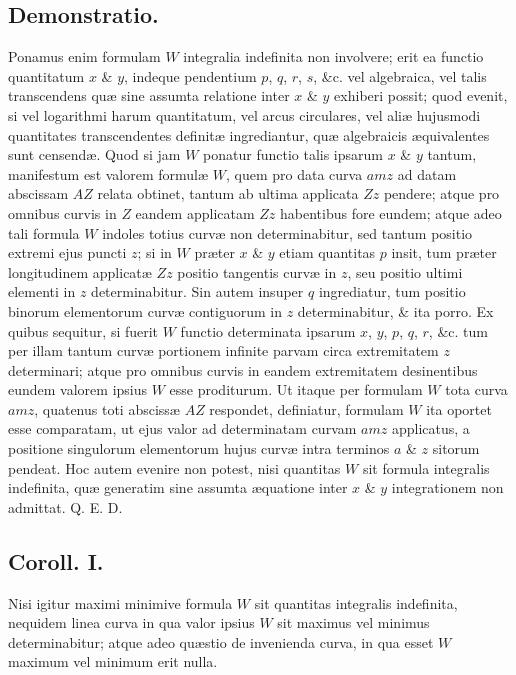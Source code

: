 \subsection*{Demonstratio.}
Ponamus enim formulam $W$ integralia indefinita non involvere; erit ea functio quantitatum $x$ \& $y$, indeque pendentium $p$, $q$, $r$, $s$, \&c. vel algebraica, vel talis transcendens quæ sine assumta relatione inter $x$ \& $y$ exhiberi possit; quod evenit, si vel logarithmi harum quantitatum, vel arcus circulares, vel aliæ hujusmodi quantitates transcendentes definitæ ingrediantur, quæ algebraicis æquivalentes sunt censendæ. Quod si jam $W$ ponatur functio talis ipsarum $x$ \& $y$ tantum, manifestum est valorem formulæ $W$, quem pro data curva $amz$ ad datam abscissam $AZ$ relata obtinet, tantum ab ultima applicata $Zz$ pendere; atque pro omnibus curvis in $Z$ eandem applicatam $Zz$ habentibus fore eundem; atque adeo tali formula $W$ indoles totius curvæ non determinabitur, sed tantum positio extremi ejus puncti $z$; si in $W$ præter $x$ \& $y$ etiam quantitas $p$ insit, tum præter longitudinem applicatæ $Zz$ positio tangentis curvæ in $z$, seu positio ultimi elementi in $z$ determinabitur. Sin autem insuper $q$ ingrediatur, tum positio binorum elementorum curvæ contiguorum in $z$ determinabitur, \& ita porro. Ex quibus sequitur, si fuerit $W$ functio determinata ipsarum $x$, $y$, $p$, $q$, $r$, \&c. tum per illam tantum curvæ portionem infinite parvam circa extremitatem $z$ determinari; atque pro omnibus curvis in eandem extremitatem desinentibus eundem valorem ipsius $W$ esse proditurum. Ut itaque per formulam $W$ tota curva $amz$, quatenus toti abscissæ $AZ$ respondet, definiatur, formulam $W$ ita oportet esse comparatam, ut ejus valor ad determinatam curvam $amz$ applicatus, a positione singulorum elementorum hujus curvæ intra terminos $a$ \& $z$ sitorum pendeat. Hoc autem evenire non potest, nisi quantitas $W$ sit formula integralis indefinita, quæ generatim sine assumta æquatione inter $x$ \& $y$ integrationem non admittat. Q. E. D.

\subsection*{Coroll. I.}
Nisi igitur maximi minimive formula $W$ sit quantitas integralis indefinita, nequidem linea curva in qua valor ipsius $W$ sit maximus vel minimus determinabitur; atque adeo quæstio de invenienda curva, in qua esset $W$ maximum vel minimum erit nulla.

